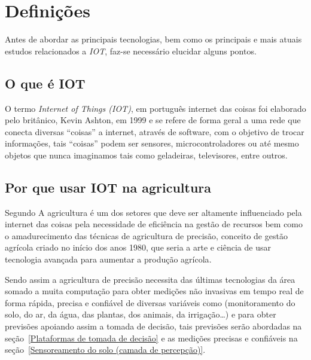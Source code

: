 \documentclass[
article,			%
12pt,				%
oneside,			%
a4paper,			%
english,			%
brazil,				%
sumario=tradicional
]{abntex2}
\begin{document}

\section{Definições}\label{Definições}
Antes de abordar as principais tecnologias, bem como os principais e mais atuais estudos relacionados a \textit{IOT}, faz-se necessário elucidar alguns pontos.
\subsection{O que é IOT}\label{O que é IOT}

O termo \textit{Internet of Things (IOT)}, em português internet das coisas foi elaborado pelo britânico, Kevin Ashton, em 1999\cite{5} e se refere de forma geral a uma rede que conecta diversas ``coisas'' a internet, através de software, com o objetivo de trocar informações\cite{defIot}, tais ``coisas'' podem ser sensores, microcontroladores ou até mesmo objetos que nunca imaginamos tais como geladeiras, televisores, entre outros.

\subsection{Por que usar IOT na agricultura}\label{Por que usar IOT na agricultura}
Segundo \citeauthor{5} A agricultura é um dos setores que deve ser altamente influenciado pela internet das coisas pela necessidade de eficiência na gestão de recursos bem como o amadurecimento das técnicas de agricultura de precisão, conceito de gestão agrícola criado no início dos anos 1980\cite{4}, que seria a arte e ciência de usar tecnologia avançada para aumentar a produção agrícola\cite{9}.

Sendo assim a agricultura de precisão necessita das últimas tecnologias da área somado a muita computação para obter medições não invasivas em tempo real de forma rápida, precisa e confiável de diversas variáveis como (monitoramento do solo, do ar, da água, das plantas, dos animais, da irrigação\ldots)\cite{10} e para obter previsões apoiando assim a tomada de decisão, tais previsões serão abordadas na seção~\ref{Plataformas de tomada de decisão} e as medições precisas e confiáveis na seção~\ref{Sensoreamento do solo (camada de percepção)}.
\end{document}
